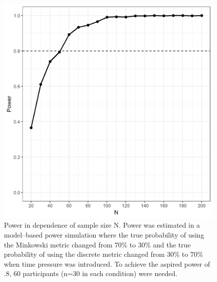 \documentclass[a4paper,man,natbib]{apa6}
\begin{document}
\begin{figure}
\centering
\includegraphics{fig_power.png}
\caption{Power in dependence of sample size N. Power was estimated in a model--based power simulation where the true probability of using the Minkowski metric changed from 70\% to 30\% and the true probability of using the discrete metric changed from 30\% to 70\% when time pressure was introduced. To achieve the aspired power of .8, 60 participants (n=30 in each condition) were needed.}
\label{fig:power}
\end{figure}
\end{document}

